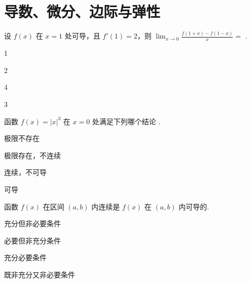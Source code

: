 \chapter{导数、微分、边际与弹性}




\begin{problem}设 $f\left( x \right)$ 在 $x = 1$ 处可导，且
$f'\left( 1 \right) = 2$，则
$\displaystyle \lim_{x \rightarrow 0}{\frac{f\left( 1 + x \right) - f(1 - x)}{x} =}$
.

\begin{abcd} \item 1

\item 2

\item 4

\item 3

\end{abcd}

\end{problem}           


\begin{problem}函数 $f\left( x \right) = \left| x \right|^{3}$ 在 $x = 0$
处满足下列哪个结论 .

\begin{abcd} \item 极限不存在

\item 极限存在，不连续

\item 连续，不可导

\item 可导

\end{abcd}


\end{problem}           


\begin{problem}函数 $f\left( x \right)$ 在区间 $(a,b)$ 内连续是 $f(x)$ 在
$(a,b)$ 内可导的.

\begin{abcd} \item 充分但非必要条件

\item 必要但非充分条件

\item 充分必要条件

\item 既非充分又非必要条件

\end{abcd}

\end{problem}           


